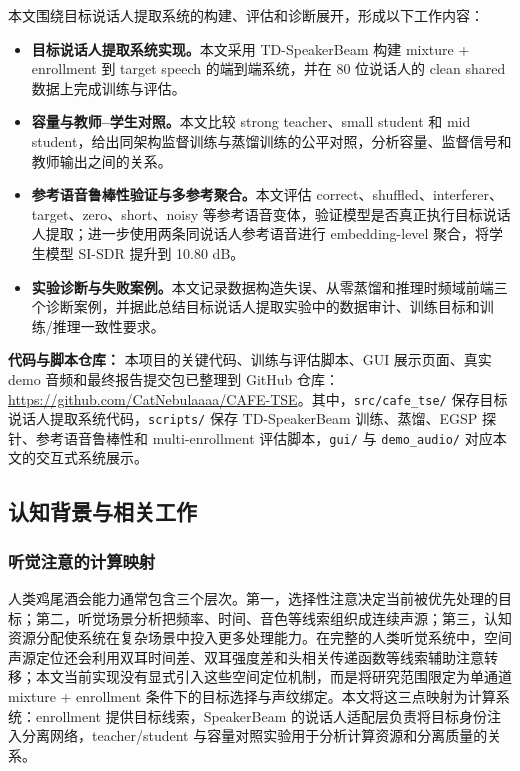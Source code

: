 \documentclass[UTF8,zihao=5,a4paper]{ctexart}
\newcommand{\sisdr}{SI-SDR}
\begin{document}
本文围绕目标说话人提取系统的构建、评估和诊断展开，形成以下工作内容：
\begin{itemize}
    \item \textbf{目标说话人提取系统实现。}本文采用 TD-SpeakerBeam 构建 mixture + enrollment 到 target speech 的端到端系统，并在 80 位说话人的 clean shared 数据上完成训练与评估。
    \item \textbf{容量与教师--学生对照。}本文比较 strong teacher、small student 和 mid student，给出同架构监督训练与蒸馏训练的公平对照，分析容量、监督信号和教师输出之间的关系。
    \item \textbf{参考语音鲁棒性验证与多参考聚合。}本文评估 correct、shuffled、interferer、target、zero、short、noisy 等参考语音变体，验证模型是否真正执行目标说话人提取；进一步使用两条同说话人参考语音进行 embedding-level 聚合，将学生模型 \sisdr{} 提升到 10.80 dB。
    \item \textbf{实验诊断与失败案例。}本文记录数据构造失误、从零蒸馏和推理时频域前端三个诊断案例，并据此总结目标说话人提取实验中的数据审计、训练目标和训练/推理一致性要求。
\end{itemize}

\noindent\textbf{代码与脚本仓库：}
本项目的关键代码、训练与评估脚本、GUI 展示页面、真实 demo 音频和最终报告提交包已整理到 GitHub 仓库：
\url{https://github.com/CatNebulaaaa/CAFE-TSE}。其中，\texttt{src/cafe\_tse/} 保存目标说话人提取系统代码，\texttt{scripts/} 保存 TD-SpeakerBeam 训练、蒸馏、EGSP 探针、参考语音鲁棒性和 multi-enrollment 评估脚本，\texttt{gui/} 与 \texttt{demo\_audio/} 对应本文的交互式系统展示。

\subsection{认知背景与相关工作}

\subsubsection{听觉注意的计算映射}

人类鸡尾酒会能力通常包含三个层次。第一，选择性注意决定当前被优先处理的目标；第二，听觉场景分析把频率、时间、音色等线索组织成连续声源；第三，认知资源分配使系统在复杂场景中投入更多处理能力\cite{bregman1990}。在完整的人类听觉系统中，空间声源定位还会利用双耳时间差、双耳强度差和头相关传递函数等线索辅助注意转移；本文当前实现没有显式引入这些空间定位机制，而是将研究范围限定为单通道 mixture + enrollment 条件下的目标选择与声纹绑定。本文将这三点映射为计算系统：enrollment 提供目标线索，SpeakerBeam 的说话人适配层负责将目标身份注入分离网络，teacher/student 与容量对照实验用于分析计算资源和分离质量的关系。
\end{document}
